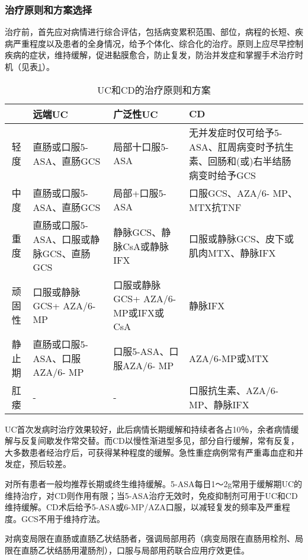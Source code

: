 \subsubsection{治疗原则和方案选择}

治疗前，首先应对病情进行综合评估，包括病变累积范围、部位，病程的长短、疾病严重程度以及患者的全身情况，给予个体化、综合化的治疗。原则上应尽早控制疾病的症状，维持缓解，促进黏膜愈合，防止复发，防治并发症和掌握手术治疗时机（见表\ref{tab13-5}）。

\begin{longtable}{cp{4cm}p{4cm}p{4cm}}
    \caption{UC和CD的治疗原则和方案}
    \label{tab13-5}\\
        \toprule
               & 远端UC                                  & 广泛性UC                          & CD                                    \\
        \midrule
        轻度   & 直肠或口服5-ASA、直肠GCS                & 局部十口服5-ASA                   &
        无并发症时仅可给予5-ASA、肛周病变时予抗生素、回肠和(或)右半结肠病变时给予GCS                                                 \\
        中度   & 直肠或口服5-ASA、直肠GCS                & 局部+口服5-ASA                    & 口服GCS、AZA/6- MP、MTX抗TNF          \\
        重度   & 直肠或口服5-ASA、口服或静脉GCS、直肠GCS & 静脉GCS、静脉CsA或静脉IFX         & 口服或静脉GCS、皮下或肌肉MTX、静脉IFX \\
        顽固性 & 口服或静脉GCS+ AZA/6-MP                 & 口服或静脉GCS+ AZA/6-MP或IFX或CsA & 静脉IFX                               \\
        静止期 & 直肠或口服5-ASA、口服AZA/6- MP          & 口服5-ASA、口服AZA/6- MP          & AZA/6-MP或MTX                         \\
        肛瘘   & -                                       & -                                 & 口服抗生素、AZA/6-MP、静脉IFX         \\
        \bottomrule
\end{longtable}

UC首次发病时治疗效果较好，此后病情长期缓解和持续者各占10％，余者病情缓解与反复间歇发作常交替。而CD以慢性渐进型多见，部分自行缓解，常有反复，大多数患者经治疗后，可获得某种程度的缓解。急性重症病例常有严重毒血症和并发症，预后较差。

对所有患者一般均推荐长期或终生维持缓解。5-ASA每日1～2g常用于缓解期UC的维持治疗，对CD则作用有限；当5-ASA治疗无效时，免疫抑制剂可用于UC和CD维持缓解。CD术后给予5-ASA或6-MP/AZA口服，以减轻复发的频率及严重程度。GCS不用于维持疗法。

对病变局限在直肠或直肠乙状结肠者，强调局部用药（病变局限在直肠用栓剂、局限在直肠乙状结肠用灌肠剂），口服与局部用药联合应用疗效更佳。

